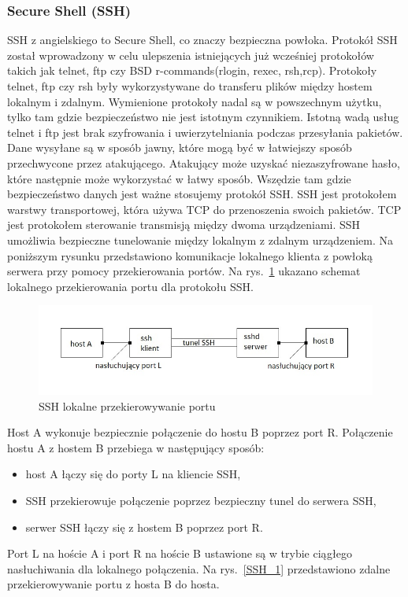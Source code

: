\documentclass[12p]{article}
\begin{document}
\subsubsection{Secure Shell (SSH)}
\quad SSH z angielskiego to Secure Shell, co znaczy bezpieczna powłoka. Protokół SSH został wprowadzony w celu ulepszenia istniejących już wcześniej protokołów takich jak telnet, ftp czy BSD r-commands(rlogin, rexec, rsh,rcp). Protokoły telnet, ftp czy rsh były wykorzystywane do transferu plików między hostem lokalnym i zdalnym. Wymienione protokoły nadal są w powszechnym użytku, tylko tam gdzie bezpieczeństwo nie jest istotnym czynnikiem. Istotną wadą usług telnet i ftp jest brak szyfrowania i uwierzytelniania podczas przesyłania pakietów. Dane wysyłane są w sposób jawny, które mogą być w łatwiejszy sposób przechwycone przez atakującego. Atakujący może uzyskać niezaszyfrowane hasło, które następnie może wykorzystać w łatwy sposób. Wszędzie tam gdzie bezpieczeństwo danych jest ważne stosujemy protokół SSH. 
\quad SSH jest protokołem warstwy transportowej, która używa TCP do przenoszenia swoich pakietów. TCP jest protokołem sterowanie transmisją między dwoma urządzeniami. SSH umożliwia bezpieczne tunelowanie między lokalnym z zdalnym urządzeniem. Na poniższym rysunku przedstawiono komunikacje lokalnego klienta z powłoką serwera przy pomocy przekierowania portów. Na rys.~\ref{SSH} ukazano schemat lokalnego przekierowania portu dla protokołu SSH.
\begin{figure}[H]
\centering
\includegraphics[width=12cm]{przekierowywanie_lokalne_SSH.jpg}
\caption{SSH lokalne przekierowywanie portu}\label{SSH}
\end{figure}

Host A wykonuje bezpiecznie połączenie do hostu B poprzez port R. Połączenie hostu A z hostem B przebiega w następujący sposób:
\begin{itemize}
\item host A łączy się do porty L na kliencie SSH,
\item SSH przekierowuje połączenie poprzez bezpieczny tunel do serwera SSH,
\item serwer SSH łączy się z hostem B poprzez port R.
\end{itemize}
\newpage
Port L na hoście A i port R na hoście B ustawione są w trybie ciągłego nasłuchiwania dla lokalnego połączenia. Na rys.~\ref{SSH_1} przedstawiono zdalne przekierowywanie portu z hosta B do hosta.
 
\end{document}
